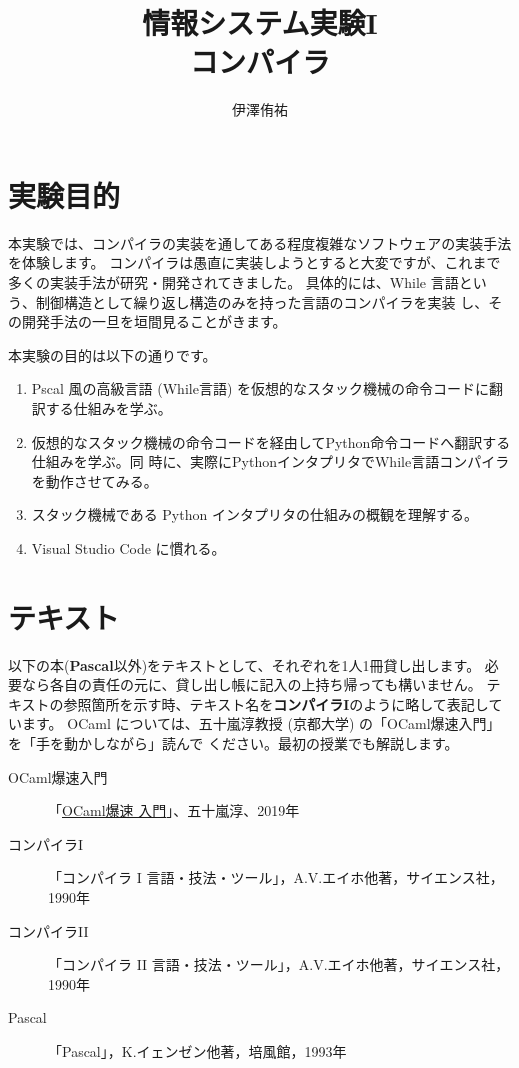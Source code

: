 \documentclass[a4paper,11pt]{jsarticle}
\title{{\bf 情報システム実験I\\コンパイラ}}
\author{伊澤侑祐}
\date{}
\begin{document}
\maketitle

\section{実験目的}
本実験では、コンパイラの実装を通してある程度複雑なソフトウェアの実装手法を体験します。
コンパイラは愚直に実装しようとすると大変ですが、これまで多くの実装手法が研究・開発されてきました。
具体的には、While 言語という、制御構造として繰り返し構造のみを持った言語のコンパイラを実装
し、その開発手法の一旦を垣間見ることがきます。


本実験の目的は以下の通りです。

\begin{enumerate}
\item Pscal 風の高級言語 (While言語) を仮想的なスタック機械の命令コードに翻訳する仕組みを学ぶ。
\item 仮想的なスタック機械の命令コードを経由してPython命令コードへ翻訳する仕組みを学ぶ。同
  時に、実際にPythonインタプリタでWhile言語コンパイラを動作させてみる。
\item スタック機械である Python インタプリタの仕組みの概観を理解する。
\item Visual Studio Code に慣れる。
\end{enumerate}

\section{テキスト}\label{text}

以下の本(\textbf{Pascal}以外)をテキストとして、それぞれを1人1冊貸し出します。
必要なら各自の責任の元に、貸し出し帳に記入の上持ち帰っても構いません。
テキストの参照箇所を示す時、テキスト名を\textbf{コンパイラI}のように略して表記しています。
OCaml については、五十嵐淳教授 (京都大学) の「OCaml爆速入門」を「手を動かしながら」読んで
ください。最初の授業でも解説します。

\begin{description}
\item[OCaml爆速入門]
  「\href{https://www.fos.kuis.kyoto-u.ac.jp/~igarashi/class/pl/03-ocaml.html}{OCaml爆速
    入門}」、五十嵐淳、2019年
\item[コンパイラI] 「コンパイラ I 言語・技法・ツール」，A.V.エイホ他著，サイエンス社，1990年
\item[コンパイラII] 「コンパイラ II 言語・技法・ツール」，A.V.エイホ他著，サイエンス社，1990年
\item[Pascal] 「Pascal」，K.イェンゼン他著，培風館，1993年
\end{description}
\end{document}

